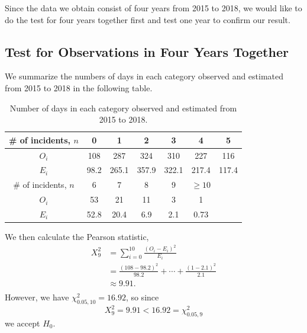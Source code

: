 \documentclass[11pt,a4paper,english]{article}
\begin{document}
Since the data we obtain consist of four years from 2015 to 2018, we would like to do the test for four years together first and test one year to confirm our result. 

\subsection{Test for Observations in Four Years Together}
We summarize the numbers of days in each category observed and estimated from 2015 to 2018 in the following table.
\begin{table}[htbp]
    \centering
	\begin{tabular}{c|cccccc}
		\hline
        \# of incidents, $n$ & 0 & 1 & 2 & 3 & 4 & 5 \\
		\hline
		$O_{i}$ & 108 & 287 & 324 & 310 & 227 & 116\\
		\hline
		$E_{i}$ & 98.2 & 265.1 & 357.9 & 322.1 & 217.4 & 117.4\\ 
		\hline
		\hline
		\# of incidents, $n$ & 6 & 7 & 8 & 9 & $\geq 10$ & \\
		\hline
		$O_{i}$ & 53 & 21 & 11 & 3 & 1 &\\
		\hline
		$E_{i}$  & 52.8 & 20.4 & 6.9 & 2.1 & 0.73 & \\ 
		\hline 
    \end{tabular}
	\caption{Number of days in each category observed and estimated from 2015 to 2018.}
\end{table}

We then calculate the Pearson statistic,
\[
	\begin{aligned}
		X_{9}^{2} &= \sum_{i = 0}^{10}\frac{(O_{i}-E_{i})^{2}}{E_{i}}\\
		&= \frac{(108-98.2)^{2}}{98.2}+\cdots+\frac{(1-2.1)^{2}}{2.1}\\
		&\approx 9.91.\\
	\end{aligned}
\] 
However, we have $\chi^{2}_{0.05,10} = 16.92$, so since 
\[X_{9}^{2} = 9.91 < 16.92 = \chi_{0.05,9}^{2}\]
we accept $H_{0}$.
\end{document}
